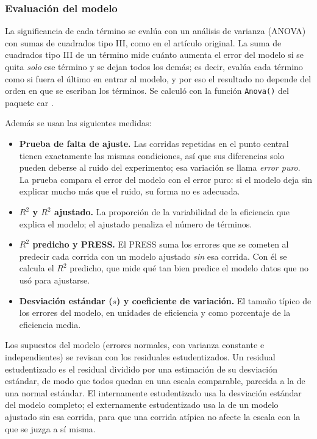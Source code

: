 \subsubsection{Evaluación del modelo}

La significancia de cada término se evalúa con un análisis de varianza (ANOVA) con sumas de cuadrados tipo III, como en el artículo original. La suma de cuadrados tipo III de un término mide cuánto aumenta el error del modelo si se quita \emph{solo} ese término y se dejan todos los demás; es decir, evalúa cada término como si fuera el último en entrar al modelo, y por eso el resultado no depende del orden en que se escriban los términos. Se calculó con la función \texttt{Anova()} del paquete \textsf{car} \citep{Fox2019}.

Además se usan las siguientes medidas:
\begin{itemize}
  \item \textbf{Prueba de falta de ajuste.} Las corridas repetidas en el punto central tienen exactamente las mismas condiciones, así que sus diferencias solo pueden deberse al ruido del experimento; esa variación se llama \emph{error puro}. La prueba compara el error del modelo con el error puro: si el modelo deja sin explicar mucho más que el ruido, su forma no es adecuada.
  \item \textbf{$R^2$ y $R^2$ ajustado.} La proporción de la variabilidad de la eficiencia que explica el modelo; el ajustado penaliza el número de términos.
  \item \textbf{$R^2$ predicho y PRESS.} El PRESS suma los errores que se cometen al predecir cada corrida con un modelo ajustado \emph{sin} esa corrida. Con él se calcula el $R^2$ predicho, que mide qué tan bien predice el modelo datos que no usó para ajustarse.
  \item \textbf{Desviación estándar ($s$) y coeficiente de variación.} El tamaño típico de los errores del modelo, en unidades de eficiencia y como porcentaje de la eficiencia media.
\end{itemize}

Los supuestos del modelo (errores normales, con varianza constante e independientes) se revisan con los residuales estudentizados. Un residual estudentizado es el residual dividido por una estimación de su desviación estándar, de modo que todos quedan en una escala comparable, parecida a la de una normal estándar. El internamente estudentizado usa la desviación estándar del modelo completo; el externamente estudentizado usa la de un modelo ajustado sin esa corrida, para que una corrida atípica no afecte la escala con la que se juzga a sí misma.

